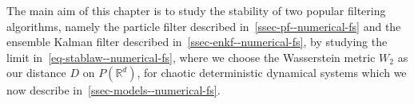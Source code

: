 The main aim of this chapter is to study the stability of two popular filtering algorithms, namely the particle filter described in~\ref{ssec-pf--numerical-fs} and the ensemble Kalman filter described in~\ref{ssec-enkf--numerical-fs}, by studying the limit in~\eqref{eq-stablaw--numerical-fs}, where we choose the Wasserstein metric $W_2$ as our distance $D$ on $P(\mathbb R^d)$, for chaotic deterministic dynamical systems which we now describe in~\ref{ssec-models--numerical-fs}.
